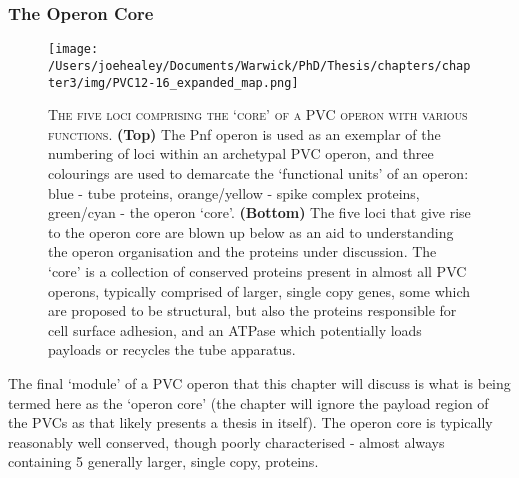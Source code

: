 \clearpage

\subsubsection{The Operon Core}
\begin{figure}[h!]
\texttt{[image: /Users/joehealey/Documents/Warwick/PhD/Thesis/chapters/chapter3/img/PVC12-16\_expanded\_map.png]}
	\captionsetup{singlelinecheck=off, justification=justified, font=footnotesize, aboveskip=10pt}
	\caption[`Core' protein region of a PVC operon]{\textsc{\normalsize The five loci comprising the `core' of a PVC operon with various functions.}\vspace{0.1cm} \newline \textbf{(Top)} The Pnf operon is used as an exemplar of the numbering of loci within an archetypal PVC operon, and three colourings are used to demarcate the `functional units' of an operon: blue - tube proteins, orange/yellow - spike complex proteins, green/cyan - the operon `core'. \textbf{(Bottom)} The five loci that give rise to the operon core are blown up below as an aid to understanding the operon organisation and the proteins under discussion. The `core' is a collection of conserved proteins present in almost all PVC operons, typically comprised of larger, single copy genes, some which are proposed to be structural, but also the proteins responsible for cell surface adhesion, and an ATPase which potentially loads payloads or recycles the tube apparatus.}
	\label{PVC11-16map}
\end{figure}

The final `module' of a PVC operon that this chapter will discuss is what is being termed here as the `operon core' (the chapter will ignore the payload region of the PVCs as that likely presents a thesis in itself). The operon core is typically reasonably well conserved, though poorly characterised - almost always containing 5 generally larger, single copy, proteins. 


